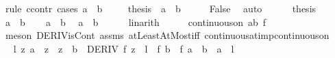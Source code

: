 \begin{isabellebody}
%
\isatagproof
{}\isamarkupfalse%
\ {\isacharparenleft}{\kern0pt}rule\ ccontr{\isacharcomma}{\kern0pt}\ cases\ {\isachardoublequoteopen}a\ {\isacharequal}{\kern0pt}\ b{\isachardoublequoteclose}{\isacharparenright}{\kern0pt}\isanewline
\ \ \isamarkupfalse%
\ {\isachardoublequoteopen}{\isasymnot}\ {\isacharquery}{\kern0pt}thesis{\isachardoublequoteclose}\ \ {\isachardoublequoteopen}a\ {\isacharequal}{\kern0pt}\ b{\isachardoublequoteclose}\isanewline
\ \ \isamarkupfalse%
\ \isamarkupfalse%
\ False\ \isamarkupfalse%
\ auto\isanewline
{}\isamarkupfalse%
\isanewline
\ \ \isamarkupfalse%
\ {\isacharasterisk}{\kern0pt}{\isacharcolon}{\kern0pt}\ {\isachardoublequoteopen}{\isasymnot}\ {\isacharquery}{\kern0pt}thesis{\isachardoublequoteclose}\isanewline
\ \ \isamarkupfalse%
\ {\isachardoublequoteopen}a\ {\isasymnoteq}\ b{\isachardoublequoteclose}\isanewline
\ \ \isamarkupfalse%
\ {\isacartoucheopen}a\ {\isasymle}\ b{\isacartoucheclose}\ \isamarkupfalse%
\ {\isachardoublequoteopen}a\ {\isacharless}{\kern0pt}\ b{\isachardoublequoteclose}\isanewline
\ \ \ \ \isamarkupfalse%
\ linarith\isanewline
\ \ \isamarkupfalse%
\ \isamarkupfalse%
\ {\isachardoublequoteopen}continuous{\isacharunderscore}{\kern0pt}on\ {\isacharbraceleft}{\kern0pt}a{\isachardot}{\kern0pt}{\isachardot}{\kern0pt}b{\isacharbraceright}{\kern0pt}\ f{\isachardoublequoteclose}\isanewline
\ \ \ \ \isamarkupfalse%
\ {\isacharparenleft}{\kern0pt}meson\ DERIV{\isacharunderscore}{\kern0pt}isCont\ assms{\isacharparenleft}{\kern0pt}{}{\isacharparenright}{\kern0pt}\ atLeastAtMost{\isacharunderscore}{\kern0pt}iff\ continuous{\isacharunderscore}{\kern0pt}at{\isacharunderscore}{\kern0pt}imp{\isacharunderscore}{\kern0pt}continuous{\isacharunderscore}{\kern0pt}on{\isacharparenright}{\kern0pt}\isanewline
\ \ \isamarkupfalse%
\ \isamarkupfalse%
\ {\isachardoublequoteopen}{\isasymexists}l\ z{\isachardot}{\kern0pt}\ a\ {\isacharless}{\kern0pt}\ z\ {\isasymand}\ z\ {\isacharless}{\kern0pt}\ b\ {\isasymand}\ DERIV\ f\ z\ {\isacharcolon}{\kern0pt}{\isachargreater}{\kern0pt}\ l\ {\isasymand}\ f\ b\ {\isacharminus}{\kern0pt}\ f\ a\ {\isacharequal}{\kern0pt}\ {\isacharparenleft}{\kern0pt}b\ {\isacharminus}{\kern0pt}\ a{\isacharparenright}{\kern0pt}\ {\isacharasterisk}{\kern0pt}\ l{\isachardoublequoteclose}\isanewline
\ \ \ \ \isamarkupfalse%

\end{isabellebody}
